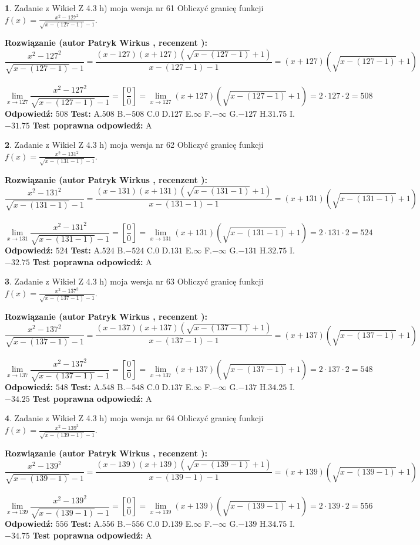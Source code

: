 \documentclass[12pt, a4paper]{article}
\theoremstyle{definition} %
\newtheorem{zad}{}
\newcommand{\zadStart}[1]{\begin{zad}#1\newline}
\newcommand{\zadStop}{\end{zad}}
\newcommand{\rozwStart}[2]{\noindent \textbf{Rozwiązanie (autor #1 , recenzent #2): }\newline}
\newcommand{\rozwStop}{\newline}
\newcommand{\odpStart}{\noindent \textbf{Odpowiedź:}\newline}
\newcommand{\odpStop}{\newline}
\newcommand{\testStart}{\noindent \textbf{Test:}\newline}
\newcommand{\testStop}{\newline}
\newcommand{\kluczStart}{\noindent \textbf{Test poprawna odpowiedź:}\newline}
\newcommand{\kluczStop}{\newline}
\begin{document}
\zadStart{Zadanie z Wikieł Z 4.3 h) moja wersja nr 61}
Obliczyć granicę funkcji $f(x)=\frac{x^{2} - 127^{2}}{\sqrt{x-(127-1)}-1}$.
\zadStop
\rozwStart{Patryk Wirkus}{}
$$\frac{x^{2} - 127^{2}}{\sqrt{x-(127-1)}-1}=\frac{(x-127)(x+127)(\sqrt{x-(127-1)}+1)}{x-(127-1)-1}=(x+127)(\sqrt{x-(127-1)}+1)$$
\\
$$\lim\limits_{x\to 127}\frac{x^{2} - 127^{2}}{\sqrt{x-(127-1)}-1}=[\frac{0}{0}]=
\lim\limits_{x\to 127}(x+127)(\sqrt{x-(127-1)}+1) = 2\cdot127 \cdot 2 = 508$$
\rozwStop
\odpStart
$508$
\odpStop
\testStart
A.$508$
B.$-508$
C.$0$
D.$127$
E.$\infty$
F.$-\infty$
G.$-127$
H.$31.75$
I.$-31.75$
\testStop
\kluczStart
A
\kluczStop



\zadStart{Zadanie z Wikieł Z 4.3 h) moja wersja nr 62}
Obliczyć granicę funkcji $f(x)=\frac{x^{2} - 131^{2}}{\sqrt{x-(131-1)}-1}$.
\zadStop
\rozwStart{Patryk Wirkus}{}
$$\frac{x^{2} - 131^{2}}{\sqrt{x-(131-1)}-1}=\frac{(x-131)(x+131)(\sqrt{x-(131-1)}+1)}{x-(131-1)-1}=(x+131)(\sqrt{x-(131-1)}+1)$$
\\
$$\lim\limits_{x\to 131}\frac{x^{2} - 131^{2}}{\sqrt{x-(131-1)}-1}=[\frac{0}{0}]=
\lim\limits_{x\to 131}(x+131)(\sqrt{x-(131-1)}+1) = 2\cdot131 \cdot 2 = 524$$
\rozwStop
\odpStart
$524$
\odpStop
\testStart
A.$524$
B.$-524$
C.$0$
D.$131$
E.$\infty$
F.$-\infty$
G.$-131$
H.$32.75$
I.$-32.75$
\testStop
\kluczStart
A
\kluczStop



\zadStart{Zadanie z Wikieł Z 4.3 h) moja wersja nr 63}
Obliczyć granicę funkcji $f(x)=\frac{x^{2} - 137^{2}}{\sqrt{x-(137-1)}-1}$.
\zadStop
\rozwStart{Patryk Wirkus}{}
$$\frac{x^{2} - 137^{2}}{\sqrt{x-(137-1)}-1}=\frac{(x-137)(x+137)(\sqrt{x-(137-1)}+1)}{x-(137-1)-1}=(x+137)(\sqrt{x-(137-1)}+1)$$
\\
$$\lim\limits_{x\to 137}\frac{x^{2} - 137^{2}}{\sqrt{x-(137-1)}-1}=[\frac{0}{0}]=
\lim\limits_{x\to 137}(x+137)(\sqrt{x-(137-1)}+1) = 2\cdot137 \cdot 2 = 548$$
\rozwStop
\odpStart
$548$
\odpStop
\testStart
A.$548$
B.$-548$
C.$0$
D.$137$
E.$\infty$
F.$-\infty$
G.$-137$
H.$34.25$
I.$-34.25$
\testStop
\kluczStart
A
\kluczStop



\zadStart{Zadanie z Wikieł Z 4.3 h) moja wersja nr 64}
Obliczyć granicę funkcji $f(x)=\frac{x^{2} - 139^{2}}{\sqrt{x-(139-1)}-1}$.
\zadStop
\rozwStart{Patryk Wirkus}{}
$$\frac{x^{2} - 139^{2}}{\sqrt{x-(139-1)}-1}=\frac{(x-139)(x+139)(\sqrt{x-(139-1)}+1)}{x-(139-1)-1}=(x+139)(\sqrt{x-(139-1)}+1)$$
\\
$$\lim\limits_{x\to 139}\frac{x^{2} - 139^{2}}{\sqrt{x-(139-1)}-1}=[\frac{0}{0}]=
\lim\limits_{x\to 139}(x+139)(\sqrt{x-(139-1)}+1) = 2\cdot139 \cdot 2 = 556$$
\rozwStop
\odpStart
$556$
\odpStop
\testStart
A.$556$
B.$-556$
C.$0$
D.$139$
E.$\infty$
F.$-\infty$
G.$-139$
H.$34.75$
I.$-34.75$
\testStop
\kluczStart
A
\kluczStop
\end{document}
